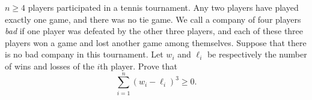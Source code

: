 $n \geq 4$ players participated in a tennis tournament. Any two players have played exactly one game, and there was no tie game. We call a company of four players \emph{bad} if one player was defeated by the other three players, and each of these three players won a game and lost another game among themselves. Suppose that there is no bad company in this tournament. Let $w_i$ and $\ell_i$ be respectively the number of wins and losses of the $i$th player. Prove that
\[
\sum_{i=1}^{n} (w_i - \ell_i)^3 \geq 0. \tag{1}
\]
